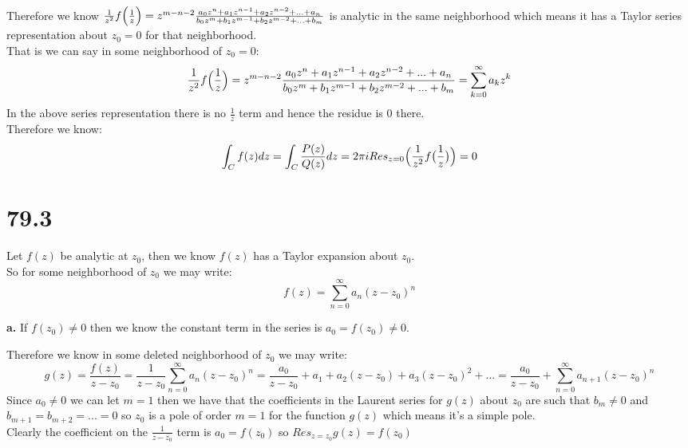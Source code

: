\documentclass{article}
\begin{document}
\begin{center}
    \\Therefore we know $\frac{1}{z^2} f\Big{(}\frac{1}{z}\Big{)} = z^{m-n-2}\frac{a_0 z^{n} + a_1 z^{n-1} + a_2 z^{n-2} + ... + a_n}{b_0 z^m + b_1 z^{m-1} + b_2 z^{m-2} + ... + b_m}$ is analytic in the same neighborhood which means it has a Taylor series representation about $z_0 = 0$ for that neighborhood.
    \\That is we can say in some neighborhood of $z_0 = 0$:
    \[\frac{1}{z^2} f\Big{(}\frac{1}{z}\Big{)} = z^{m-n-2}\frac{a_0 z^{n} + a_1 z^{n-1} + a_2 z^{n-2} + ... + a_n}{b_0 z^m + b_1 z^{m-1} + b_2 z^{m-2} + ... + b_m} =\sum _{k=0}^{\infty} a_k z^k\]
    In the above series representation there is no $\frac{1}{z}$ term and hence the residue is 0 there.
    \\Therefore we know:
    \[\int _C f(z) dz =\int _C\frac{P(z)}{Q(z)} dz = 2\pi i Res_{z=0}\Big{(}\frac{1}{z^2} f\big{(}\frac{1}{z}\big{)}\Big{)} = 0\]
    \qedsymbol
\end{center}


\newpage
\section*{79.3}
\begin{center}
    \doublespacing
    Let $f(z)$ be analytic at $z_0$, then we know $f(z)$ has a Taylor expansion about $z_0$.
    \\So for some neighborhood of $z_0$ we may write:
    \[f(z) =\sum _{n=0}^{\infty} a_n (z - z_0)^n\]
\end{center}

{\Large\textbf{a.}} If $f(z_0)\neq 0$ then we know the constant term in the series is $a_0 = f(z_0)\neq 0$.
\begin{center}
    \doublespacing
    Therefore we know in some deleted neighborhood of $z_0$ we may write:
    \[g(z) =\frac{f(z)}{z - z_0} =\frac{1}{z - z_0}\sum _{n=0}^{\infty} a_n (z - z_0)^n =\frac{a_0}{z - z_0} + a_1 + a_2 (z - z_0) + a_3 (z - z_0)^2 + ... =\frac{a_0}{z - z_0} +\sum _{n=0}^{\infty} a_{n+1} (z - z_0)^n\]
    Since $a_0\neq 0$ we can let $m = 1$ then we have that the coefficients in the Laurent series for $g(z)$ about $z_0$ are such that $b_m\neq 0$ and $b_{m+1} = b_{m+2} = ... = 0$ so $z_0$ is a pole of order $m = 1$ for the function $g(z)$ which means it's a simple pole.
    \\Clearly the coefficient on the $\frac{1}{z - z_0}$ term is $a_0 = f(z_0)$ so $Res_{z=z_0} g(z) = f(z_0)$ \qedsymbol
\end{center}
\end{document}
